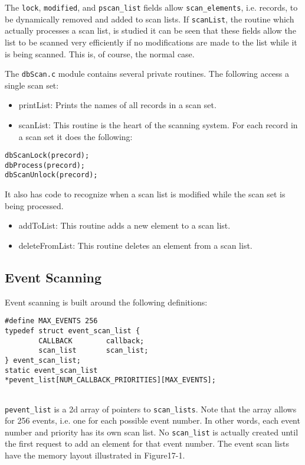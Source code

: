 The \verb|lock|, \verb|modified|, and \verb|pscan_list| fields allow \verb|scan_elements|, i.e. records, to be dynamically removed and 
added to scan lists. If \verb|scanList|, the routine which actually processes a scan list, is studied it can be seen that these fields 
allow the list to be scanned very efficiently if no modifications are made to the list while it is being scanned. This is, of 
course, the normal case.

The \verb|dbScan.c| module contains several private routines. The following access a single scan set: 

\begin{itemize}\item printList:  Prints the names of all records in a scan set.

\item scanList:  This routine is the heart of the scanning system. For each record in a scan set it does the following:

\end{itemize}\begin{verbatim}dbScanLock(precord);
dbProcess(precord);
dbScanUnlock(precord);
\end{verbatim}\begin{description}\item It also has code to recognize when a scan list is modified while the scan set is being processed.

\end{description}\begin{itemize}\item addToList:  This routine adds a new element to a scan list.

\item deleteFromList:  This routine deletes an element from a scan list.

\end{itemize}\subsection{Event Scanning}

Event scanning is built around the following definitions:

\begin{verbatim}#define MAX_EVENTS 256
typedef struct event_scan_list {
        CALLBACK        callback;
        scan_list       scan_list;
} event_scan_list;
static event_scan_list
*pevent_list[NUM_CALLBACK_PRIORITIES][MAX_EVENTS];
 

\end{verbatim}\verb|pevent_list| is a 2d array of pointers to \verb|scan_lists|. Note that the array allows for 256 events, i.e. one for each 
possible event number. In other words, each event number and priority has its own scan list. No \verb|scan_list| is actually 
created until the first request to add an element for that event number. The event scan lists have the memory layout 
illustrated in Figure17-1.

